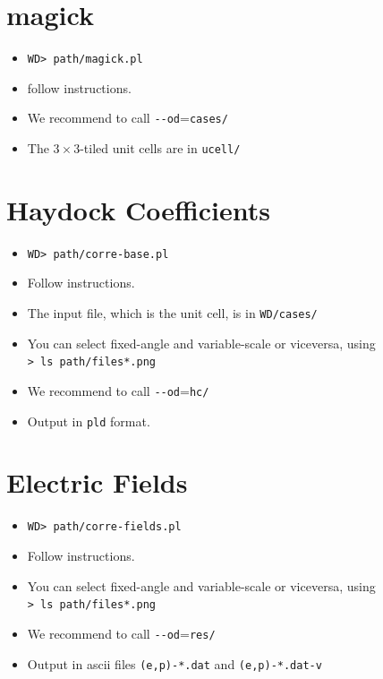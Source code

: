 \documentclass[preprint,12pt]{revtex4}
\begin{document}
\section{magick}\label{sec:magick}
\begin{itemize}
\item \verb=WD> path/magick.pl=
\item follow instructions.
\item We recommend to call \verb=--od==\verb=cases/=
\item The $3\times 3$-tiled unit cells are in \verb=ucell/=
\end{itemize}
\section{Haydock Coefficients}
\begin{itemize}
\item \verb=WD> path/corre-base.pl=
\item Follow instructions. 
\item The input file, which is the unit cell, is in \verb=WD/cases/=
\item You can select fixed-angle and variable-scale or viceversa,
  using\\
\verb=> ls path/files*.png=
\item We recommend to call \verb=--od==\verb=hc/=
\item Output in \verb=pld= format.
\end{itemize}
\section{Electric Fields}
\begin{itemize}
\item \verb=WD> path/corre-fields.pl=
\item Follow instructions. 
\item You can select fixed-angle and variable-scale or viceversa,
  using\\
\verb=> ls path/files*.png=

\item We recommend to call \verb=--od==\verb=res/=
\item Output in ascii files \verb=(e,p)-*.dat= and \verb=(e,p)-*.dat-v=
\end{itemize}
\end{document}
